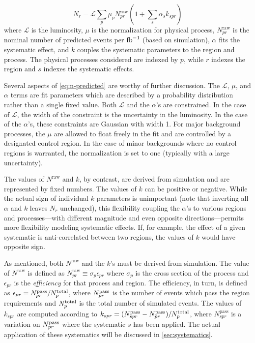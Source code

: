 \begin{equation}
  N_r = \mathcal{L} \sum_{p} \mu_p N_{pr}^{\text{raw}} \left(1 + \sum_{s} \alpha_s k_{spr}\right)
\label{eq:n-predicted}
\end{equation}
where $\mathcal{L}$ is the luminosity, $\mu$ is the normalization for physical process, $N_{pr}^{\text{raw}}$ is the nominal number of predicted events per $\text{fb}^{-1}$ (based on simulation), $\alpha$ fits the systematic effect, and $k$ couples the systematic parameters to the region and process. The physical processes considered are indexed by $p$, while $r$ indexes the region and $s$ indexes the systematic effects.

Several aspects of \cref{eq:n-predicted} are worthy of further discussion. The $\mathcal{L}$, $\mu$, and $\alpha$ terms are fit parameters which are described by a probability distribution rather than a single fixed value.
Both $\mathcal{L}$ and the $\alpha$'s are constrained. In the case of $\mathcal{L}$, the width of the constraint is the uncertainty in the luminosity. In the case of the $\alpha$'s, these constraints are Gaussian with width 1.
For major background processes, the $\mu$ are allowed to float freely in the fit and are controlled by a designated control region. In the case of minor backgrounds where no control regions is warranted, the normalization is set to one (typically with a large uncertainty).

The values of $N^{\text{raw}}$ and $k$, by contrast, are derived from simulation and are represented by fixed numbers.
The values of $k$ can be positive or negative. While the actual sign of individual $k$ parameters is unimportant (note that inverting all $\alpha$ and $k$ leaves $N_r$ unchanged), this flexibility coupling the $\alpha$'s to various regions and processes---with different magnitude and even opposite directions---permits more flexibility modeling systematic effects. If, for example, the effect of a given systematic is anti-correlated between two regions, the values of $k$ would have opposite sign.

As mentioned, both $N^{\text{raw}}$ and the $k$'s must be derived from simulation. The value of $N^{\text{raw}}$ is defined as
$N_{pr}^{\text{raw}} \equiv \sigma_{p} \epsilon_{pr}$ where $\sigma_{p}$ is the cross section of the process and $\epsilon_{pr}$ is the \emph{efficiency} for that process and region.
The efficiency, in turn, is defined as $\epsilon_{pr} = N_{pr}^{\rm pass} / N^{\rm total}_{p}$, where $N^{\rm pass}_{pr}$ is the number of events which pass the region requirements and $N^{\rm total}_p$ is the total number of simulated events. The values of $k_{spr}$ are computed according to $k_{spr} = (N^{\text{pass}}_{spr} - N^{\text{pass}}_{pr}) / N^{\rm total}_{p}$, where $N^{\text{pass}}_{spr}$ is a variation on $N^{\rm pass}_{pr}$ where the systematic $s$ has been applied. The actual application of these systematics will be discussed in \cref{sec:systematics}.

